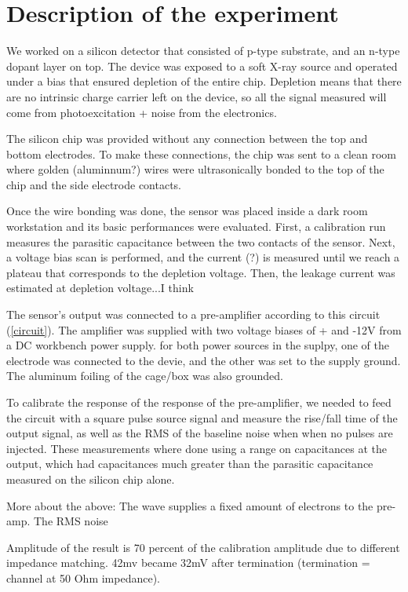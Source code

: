\documentclass[12pt]{article}
\begin{document}
\maketitle

\section{Description of the experiment}

We worked on a silicon detector that consisted of p-type substrate, and an n-type dopant layer on top. The device was exposed to a soft X-ray source and operated under a bias that ensured depletion of the entire chip. Depletion means that there are no intrinsic charge carrier left on the device, so all the signal measured will come from photoexcitation + noise from the electronics.

The silicon chip was provided without any connection between the top and bottom electrodes. To make these connections, the chip was sent to a clean room where golden (aluminnum?) wires were ultrasonically bonded to the top of the chip and the side electrode contacts.

Once the wire bonding was done, the sensor was placed inside a dark room workstation and its basic performances were evaluated. First, a calibration run measures the parasitic capacitance between the two contacts of the sensor. Next, a voltage bias scan is performed, and the current (?) is measured until we reach a plateau that corresponds to the depletion voltage. Then, the leakage current was estimated at depletion voltage...I think


The sensor's output was connected to a pre-amplifier according to this circuit (\ref{circuit}). The amplifier was supplied with two voltage biases of + and -12V from a DC workbench power supply. for both power sources in the suplpy, one of the electrode was connected to the devie, and the other was set to the supply ground. The aluminum foiling of the cage/box was also grounded.


To calibrate the response of the response of the pre-amplifier, we needed to feed the circuit with a square pulse source signal and measure the rise/fall time of the output signal, as well as the RMS of the baseline noise when when no pulses are injected. These measurements where done using a range on capacitances at the output, which had capacitances much greater than the parasitic capacitance measured on the silicon chip alone.

More about the above: The wave supplies a fixed amount of electrons to the pre-amp. The RMS noise 

Amplitude of the result is 70 percent of the calibration amplitude due to different impedance matching.
42mv became 32mV after termination (termination = channel at 50 Ohm impedance).
\end{document}
